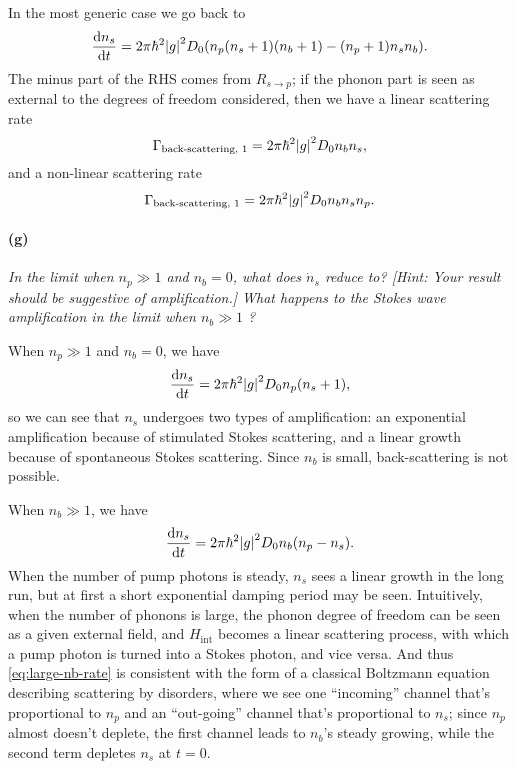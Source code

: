 \documentclass[hyperref, a4paper]{article}
\begin{document}
In the most generic case we go back to 
\begin{equation}
    \dv{n_s}{t} = 2\pi \hbar^2 \abs{g}^2 D_0 (
        n_p (n_s + 1) (n_b + 1) - (n_p + 1) n_s n_b 
    ).
\end{equation}
The minus part of the RHS comes from $R_{s \to p}$; 
if the phonon part is seen as external to the degrees of freedom considered, 
then we have a linear scattering rate 
\begin{equation}
    \Gamma_{\text{back-scattering, 1}} = 2 \pi \hbar^2 \abs{g}^2 D_0 n_b n_s,
\end{equation}
and a non-linear scattering rate 
\begin{equation}
    \Gamma_{\text{back-scattering, 1}} = 2 \pi \hbar^2 \abs{g}^2 D_0 n_b n_s n_p.
\end{equation}

\paragraph*{(g)} \textit{
In the limit when $n_p \gg 1$ and $n_b=0$, what does $\dot{n}_s$ reduce to? [Hint: Your result should be suggestive of amplification.] What happens to the Stokes wave amplification in the limit when $n_b \gg 1$ ?
}

When $n_p \gg 1$ and $n_b=0$, we have 
\begin{equation}
    \dv{n_s}{t} = 2 \pi \hbar^2 \abs{g}^2 D_0 n_p (n_s + 1),
\end{equation}
so we can see that $n_s$ undergoes two types of amplification:
an exponential amplification because of stimulated Stokes scattering, 
and a linear growth because of spontaneous Stokes scattering.
Since $n_b$ is small, back-scattering is not possible.

When $n_b \gg 1$, we have 
\begin{equation}
    \dv{n_s}{t} = 2 \pi \hbar^2 \abs{g}^2 D_0 n_b (n_p - n_s).
    \label{eq:large-nb-rate}
\end{equation}
When the number of pump photons is steady, 
$n_s$ sees a linear growth in the long run, 
but at first a short exponential damping period may be seen.
Intuitively, when the number of phonons is large, 
the phonon degree of freedom can be seen as a given external field, 
and $H_{\text{int}}$ becomes a linear scattering process, 
with which a pump photon is turned into a Stokes photon, 
and vice versa. 
And thus \eqref{eq:large-nb-rate} is consistent with the form of 
a classical Boltzmann equation describing scattering by disorders,
where we see one ``incoming'' channel that's proportional to $n_p$
and an ``out-going'' channel that's proportional to $n_s$;
since $n_p$ almost doesn't deplete, 
the first channel leads to $n_b$'s steady growing, 
while the second term depletes $n_s$ at $t = 0$.
\end{document}
